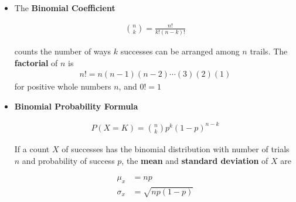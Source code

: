 \documentclass[Main.tex]{subfiles}
\begin{document}
	\begin{example} \hfill \\
		\begin{itemize}	
			\item The \textbf{Binomial Coefficient}\hfill
			\begin{definition}\hfill
				\begin{subequations}
					\begin{align}
					\binom{n}{k} =\frac{n!}{k!(n-k)!}
					\end{align}
				\end{subequations}\hfill	
			\end{definition}
			counts the number of ways $k$ successes can be arranged among $n$ trails. The \textbf{factorial} of $n$ is\hfill
				\begin{subequations}
					\begin{align}
					n!=n(n-1)(n-2)\cdots (3)(2)(1)
					\end{align}
				\end{subequations}	
			for positive whole numbers $n$, and $0!=1$\hfill \\
			\item \textbf{Binomial Probability Formula}
			\begin{definition}\hfill
				\begin{subequations}
					\begin{align}
					P(X=K)=\binom{n}{k}p^{k}(1-p)^{n-k}
					\end{align}
				\end{subequations}\hfill	
			\end{definition}
			If a count $X$ of successes has the binomial distribution with number of trials $n$ and probability of success $p$, the \textbf{mean} and \textbf{standard deviation} of $X$ are	
			\begin{definition}\index{[Mean and Standard deviation of Binomial distribution}\hfill
				\begin{subequations}
					\begin{align}
					\mu_{x}&=np\\
					\sigma_{x}&=\sqrt{np(1-p)}
					\end{align}
				\end{subequations}\hfill	
			\end{definition}												
		\end{itemize}
	\end{example}
	
\end{document}
